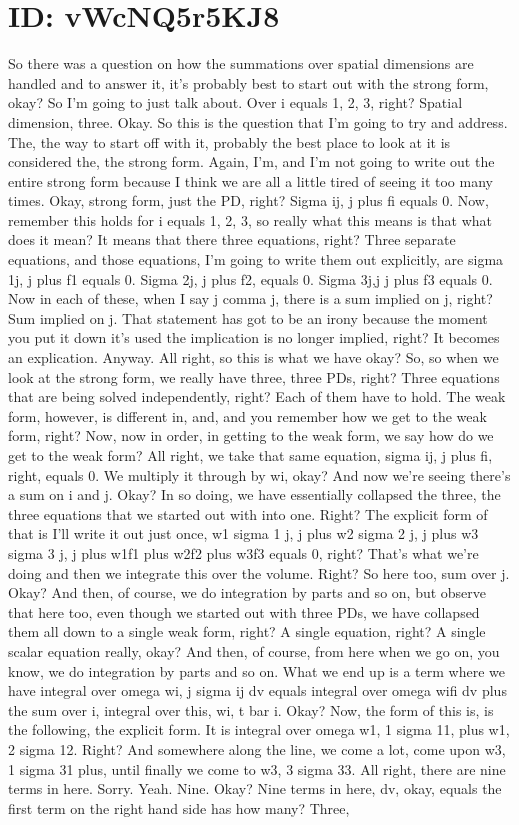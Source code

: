 \documentclass[10pt]{article}
\begin{document}
\section*{ID: vWcNQ5r5KJ8}
So there was a question on how the summations over spatial dimensions are handled and to answer it, it's probably best to start out with the strong form, okay? So I'm going to just talk about. Over i equals 1, 2, 3, right? Spatial dimension, three. Okay. So this is the question that I'm going to try and address. The, the way to start off with it, probably the best place to look at it is considered the, the strong form. Again, I'm, and I'm not going to write out the entire strong form because I think we are all a little tired of  seeing it too many times. Okay, strong form, just the PD, right? Sigma ij, j plus fi equals 0. Now, remember this holds for i equals 1, 2, 3, so really what this means is that what does it mean? It means that there three equations, right? Three separate equations, and those equations, I'm going to write them out explicitly, are sigma 1j, j plus f1 equals 0. Sigma 2j, j plus f2, equals 0. Sigma 3j,j j plus f3 equals 0. Now in each of these, when I say j comma j, there is a sum implied on j, right? Sum implied on j. That statement has got to be an irony because the moment you put it down it's used the implication is no longer implied, right? It becomes an explication. Anyway. All right, so this is what we have okay? So, so when we look at the strong form, we really have three, three PDs, right? Three equations that are being solved independently, right? Each of them have to hold. The weak form, however, is different in, and, and you remember how we get to the weak form, right? Now, now in order, in getting to the weak form, we say how do we get to the weak form? All right, we take that same equation, sigma ij, j plus fi, right, equals 0. We multiply it through by wi, okay? And now we're seeing there's a sum on i and j. Okay? In so doing, we have essentially collapsed the three, the three equations that we started out with into one. Right? The explicit form of that is I'll write it out just once, w1 sigma 1 j, j plus w2 sigma 2 j, j plus w3 sigma 3 j, j plus w1f1 plus w2f2 plus w3f3 equals 0, right? That's what we're doing and then we integrate this over the volume. Right? So here too, sum over j. Okay? And then, of course, we do integration by parts and so on, but observe that here too, even though we started out with three PDs, we have collapsed them all down to a single weak form, right? A single equation, right? A single scalar equation really, okay? And then, of course, from here when we go on, you know, we do integration by parts and so on. What we end up is a term where we have integral over omega wi, j sigma ij dv equals integral over omega wifi dv plus the sum over i, integral over this, wi, t bar i. Okay? Now, the form of this is, is the following, the explicit form. It is integral over omega w1, 1 sigma 11, plus w1, 2 sigma 12.  Right? And somewhere along the line, we come a lot, come upon w3, 1 sigma 31 plus, until finally we come to w3, 3 sigma 33. All right, there are nine terms in here. Sorry. Yeah. Nine. Okay? Nine terms in here, dv, okay, equals the first term on the right hand side has how many? Three, 
\end{document}

